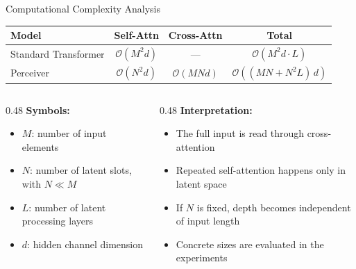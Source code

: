 \documentclass[aspectratio=169,11pt]{beamer}
\begin{document}
\begin{frame}[shrink=5]{Computational Complexity Analysis}
  \small
  \begin{table}
    \centering\small
    \begin{tabular}{lccc}
      \toprule
      \textbf{Model} & \textbf{Self-Attn} & \textbf{Cross-Attn} & \textbf{Total} \\
      \midrule
      Standard Transformer & $\mathcal{O}(M^2 d)$ & --- & $\mathcal{O}(M^2 d \cdot L)$ \\
      \midrule
      Perceiver & $\mathcal{O}(N^2 d)$ & $\mathcal{O}(MNd)$ & $\mathcal{O}((MN + N^2 L)\,d)$ \\
      \bottomrule
    \end{tabular}
  \end{table}

  \vspace{0.5em}
  \begin{columns}[T]
    \begin{column}{0.48\textwidth}
      \textbf{Symbols:}
      \begin{itemize}
        \item $M$: number of input elements
        \item $N$: number of latent slots, with $N \ll M$
        \item $L$: number of latent processing layers
        \item $d$: hidden channel dimension
      \end{itemize}
    \end{column}
    \begin{column}{0.48\textwidth}
      \textbf{Interpretation:}
      \begin{itemize}
        \item The full input is read through cross-attention
        \item Repeated self-attention happens only in latent space
        \item If $N$ is fixed, depth becomes independent of input length
        \item Concrete sizes are evaluated in the experiments
      \end{itemize}
    \end{column}
  \end{columns}
\end{frame}
\end{document}
